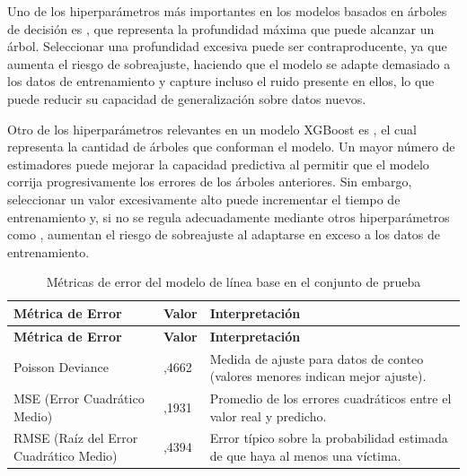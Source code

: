 
Uno de los hiperparámetros más importantes en los modelos basados en árboles de decisión es , que representa la profundidad máxima que puede alcanzar un árbol. Seleccionar una profundidad excesiva puede ser contraproducente, ya que aumenta el riesgo de sobreajuste, haciendo que el modelo se adapte demasiado a los datos de entrenamiento y capture incluso el ruido presente en ellos, lo que puede reducir su capacidad de generalización sobre datos nuevos.

Otro de los hiperparámetros relevantes en un modelo XGBoost es , el cual representa la cantidad de árboles que conforman el modelo. Un mayor número de estimadores puede mejorar la capacidad predictiva al permitir que el modelo corrija progresivamente los errores de los árboles anteriores. Sin embargo, seleccionar un valor excesivamente alto puede incrementar el tiempo de entrenamiento y, si no se regula adecuadamente mediante otros hiperparámetros como , aumentan el riesgo de sobreajuste al adaptarse en exceso a los datos de entrenamiento.

\begin{longtable}[]{@{}
>{\raggedright\arraybackslash}p{}
  >{\centering\arraybackslash}p{}
  >{\raggedright\arraybackslash}p{}@{}}
\caption{Métricas de error del modelo de línea base en el conjunto de prueba}
\label{tab:metricas-error-baseline}\\
\toprule\noalign{}
\textbf{Métrica de Error} & \textbf{Valor} & \textbf{Interpretación} \\
\midrule\noalign{}
\endfirsthead
\toprule\noalign{}
\textbf{Métrica de Error} & \textbf{Valor} & \textbf{Interpretación} \\
\midrule\noalign{}
\endhead
\bottomrule\noalign{}
\endlastfoot
Poisson Deviance & 0,4662 & Medida de ajuste para datos de conteo (valores menores indican mejor ajuste). \\
MSE (Error Cuadrático Medio) & 0,1931 & Promedio de los errores cuadráticos entre el valor real y predicho. \\
RMSE (Raíz del Error Cuadrático Medio) & 0,4394 & Error típico sobre la probabilidad estimada de que haya al menos una víctima. \\
\end{longtable}

